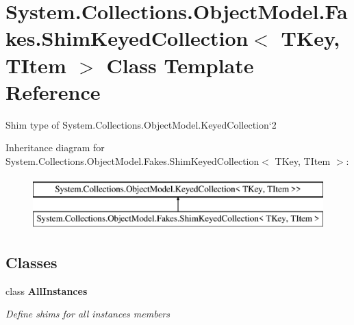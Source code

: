 \hypertarget{class_system_1_1_collections_1_1_object_model_1_1_fakes_1_1_shim_keyed_collection_3_01_t_key_00_01_t_item_01_4}{\section{System.\-Collections.\-Object\-Model.\-Fakes.\-Shim\-Keyed\-Collection$<$ T\-Key, T\-Item $>$ Class Template Reference}
\label{class_system_1_1_collections_1_1_object_model_1_1_fakes_1_1_shim_keyed_collection_3_01_t_key_00_01_t_item_01_4}
}


Shim type of System.\-Collections.\-Object\-Model.\-Keyed\-Collection`2 


Inheritance diagram for System.\-Collections.\-Object\-Model.\-Fakes.\-Shim\-Keyed\-Collection$<$ T\-Key, T\-Item $>$\-:\begin{figure}[H]
\begin{center}
\leavevmode
\includegraphics[height=2.000000cm]{class_system_1_1_collections_1_1_object_model_1_1_fakes_1_1_shim_keyed_collection_3_01_t_key_00_01_t_item_01_4}
\end{center}
\end{figure}
\subsection*{Classes}
\begin{DoxyCompactItemize}
\item 
class {\bfseries All\-Instances}
\begin{DoxyCompactList}\small\item\em Define shims for all instances members\end{DoxyCompactList}\end{DoxyCompactItemize}
